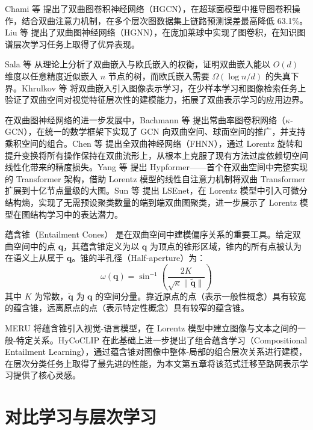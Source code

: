 Chami 等\cite{Chami2019} 提出了双曲图卷积神经网络（HGCN），在超球面模型中推导图卷积操作，结合双曲注意力机制，在多个层次图数据集上链路预测误差最高降低 63.1\%。Liu 等\cite{Liu2019} 提出了双曲图神经网络（HGNN），在庞加莱球中实现了图卷积，在知识图谱层次学习任务上取得了优异表现。

Sala 等\cite{Sala2018} 从理论上分析了双曲嵌入与欧氏嵌入的权衡，证明双曲嵌入能以 $O(d)$ 维度以任意精度近似嵌入 $n$ 节点的树，而欧氏嵌入需要 $\Omega(\log n / d)$ 的失真下界。Khrulkov 等\cite{Khrulkov2020} 将双曲嵌入引入图像表示学习，在少样本学习和图像检索任务上验证了双曲空间对视觉特征层次性的建模能力，拓展了双曲表示学习的应用边界。

在双曲图神经网络的进一步发展中，Bachmann 等\cite{bachmann2020kgcn} 提出常曲率图卷积网络（$\kappa$-GCN），在统一的数学框架下实现了 GCN 向双曲空间、球面空间的推广，并支持乘积空间的组合。Chen 等\cite{chen2022fullyhyperbolic} 提出全双曲神经网络（FHNN），通过 Lorentz 旋转和提升变换将所有操作保持在双曲流形上，从根本上克服了现有方法过度依赖切空间线性化带来的精度损失。Yang 等\cite{yang2024hypformer} 提出 Hypformer——首个在双曲空间中完整实现的 Transformer 架构，借助 Lorentz 模型的线性自注意力机制将双曲 Transformer 扩展到十亿节点量级的大图。Sun 等\cite{sun2024lsenet} 提出 LSEnet，在 Lorentz 模型中引入可微分结构熵，实现了无需预设聚类数量的端到端双曲图聚类，进一步展示了 Lorentz 模型在图结构学习中的表达潜力。

蕴含锥（Entailment Cones）\cite{ganea2018entailment} 是在双曲空间中建模偏序关系的重要工具。给定双曲空间中的点 $\mathbf{q}$，其蕴含锥定义为以 $\mathbf{q}$ 为顶点的锥形区域，锥内的所有点被认为在语义上从属于 $\mathbf{q}$。锥的半孔径（Half-aperture）为：
\begin{equation}
    \omega(\mathbf{q}) = \sin^{-1}\left(\frac{2K}{\sqrt{\kappa}\|\tilde{\mathbf{q}}\|}\right)
\end{equation}
其中 $K$ 为常数，$\tilde{\mathbf{q}}$ 为 $\mathbf{q}$ 的空间分量。靠近原点的点（表示一般性概念）具有较宽的蕴含锥，远离原点的点（表示特定性概念）具有较窄的蕴含锥。

MERU\cite{desai2023meru} 将蕴含锥引入视觉-语言模型，在 Lorentz 模型中建立图像与文本之间的一般-特定关系。HyCoCLIP\cite{pal2025hycoclip} 在此基础上进一步提出了组合蕴含学习（Compositional Entailment Learning），通过蕴含锥对图像中整体-局部的组合层次关系进行建模，在层次分类任务上取得了最先进的性能，为本文第五章将该范式迁移至路网表示学习提供了核心灵感。

\section{对比学习与层次学习}


